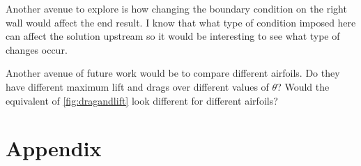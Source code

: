 \documentclass[12pt]{article}
\theoremstyle{definition}
\numberwithin{equation}{section}
\begin{document}
	Another avenue to explore is how changing the boundary condition on the right wall would affect the end result. I know that what type of condition imposed here can affect the solution upstream so it would be interesting to see what type of changes occur. 
	
	Another avenue of future work would be to compare different airfoils. Do they have different maximum lift and drags over different values of $\theta$? Would the equivalent of \cref{fig:dragandlift} look different for different airfoils?
	
	
	
	\section*{Appendix}
	
	
	
\end{document}
